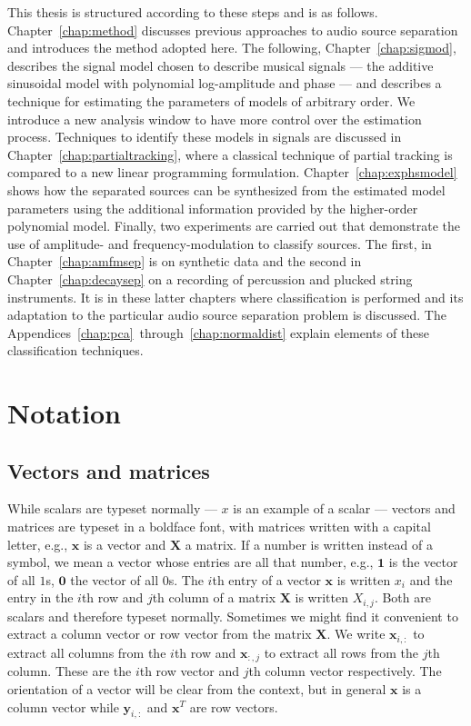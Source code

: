 This thesis is structured according to these steps and is as follows.
Chapter~\ref{chap:method} discusses previous approaches to audio source
separation and introduces the method adopted here. The following,
Chapter~\ref{chap:sigmod}, describes the signal model chosen to describe musical
signals --- the additive sinusoidal model with polynomial log-amplitude and
phase --- and describes a technique for estimating the parameters of models of
arbitrary order. We introduce a new analysis window to have more control over the
estimation process. Techniques to identify these models in signals are discussed in
Chapter~\ref{chap:partialtracking}, where a classical technique of partial
tracking is compared to a new linear programming formulation.
Chapter~\ref{chap:exphsmodel} shows how the separated sources can be synthesized
from the estimated model parameters using the additional information provided by
the higher-order polynomial model. Finally, two experiments are carried out that
demonstrate the use of amplitude- and frequency-modulation to classify sources.
The first, in Chapter~\ref{chap:amfmsep} is on synthetic data and the second in
Chapter~\ref{chap:decaysep} on a recording of percussion and plucked string
instruments. It is in these latter chapters where classification is performed
and its adaptation to the particular audio source separation problem is
discussed. The Appendices~\ref{chap:pca}~through~\ref{chap:normaldist} explain
elements of these classification techniques.

\section{Notation}

\subsection{Vectors and matrices}

While scalars are typeset normally --- $x$ is an example of a scalar --- vectors
and matrices are typeset in a boldface font, with matrices written with a
capital letter, e.g., $\boldsymbol{x}$ is a vector and $\boldsymbol{X}$ a
matrix. If a number is written instead of a symbol, we mean a vector whose
entries are all that
number, e.g., $\boldsymbol{1}$ is the vector of all $1$s, $\boldsymbol{0}$ the
vector of all $0$s. The $i$th entry of a vector $\boldsymbol{x}$ is written
$x_{i}$ and the entry in the $i$th row and $j$th column of a matrix
$\boldsymbol{X}$ is
written $X_{i,j}$.  Both are scalars and therefore typeset normally. Sometimes
we might find it convenient to extract a column vector or row vector from the
matrix $\boldsymbol{X}$. We write $\boldsymbol{x}_{i,:}$ to extract all columns
from the $i$th row and $\boldsymbol{x}_{:,j}$ to extract all rows from the
$j$th column. These are the $i$th row vector and $j$th column vector
respectively. The orientation of a vector will be clear from the context, but in
general $\boldsymbol{x}$ is a column vector while $\boldsymbol{y}_{i,:}$ and
$\boldsymbol{x}^{T}$ are row vectors.

